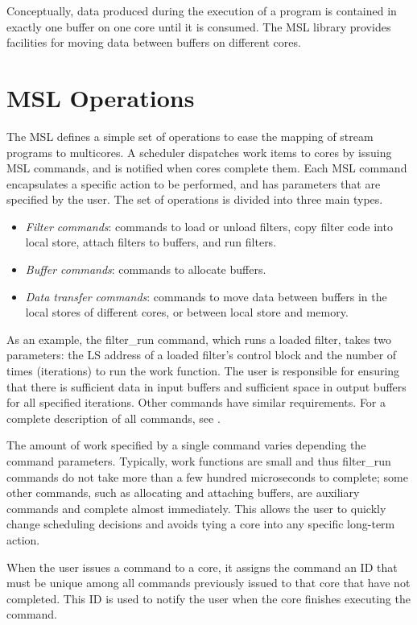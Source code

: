 Conceptually, data produced during the execution of a program is
contained in exactly one buffer on one core until it is consumed. The
MSL library provides facilities for moving data between buffers on
different cores.
 
\section{MSL Operations}

The MSL defines a simple set of operations to ease the mapping of stream
programs to multicores. A scheduler dispatches work items to cores by
issuing MSL commands, and is notified when cores complete
them. Each MSL command encapsulates a specific action to be
performed, and has parameters that are specified by the user. The
set of operations is divided into three main types.
\begin{itemize}
\item {\it Filter commands}: commands to load or unload filters, copy filter code into local store, attach filters to buffers, and run filters.
\item {\it Buffer commands}: commands to allocate buffers.
\item {\it Data transfer commands}: commands to move data between buffers in the local stores of different cores, or between local store and memory.
\end{itemize}

As an example, the \textsf{filter\_run} command, which runs a loaded
filter, takes two parameters: the LS address of a loaded filter's
control block and the number of times (iterations) to run the work function.
The user is responsible for ensuring that there is sufficient
data in input buffers and sufficient space in output buffers for all
specified iterations. Other commands have similar requirements. For a
complete description of all commands, see \cite{dxzhang-meng-07}.

The amount of work specified by a single command varies depending the
command parameters. Typically, work functions are small and thus
\textsf{filter\_run} commands do not take more than a few hundred
microseconds to complete; some other commands, such as allocating and
attaching buffers, are auxiliary commands and complete almost
immediately. This allows the user to quickly change scheduling
decisions and avoids tying a core into any specific long-term action.

When the user issues a command to a core, it assigns the command an ID
that must be unique among all commands previously issued to that core
that have not completed. This ID is used to notify the user when the
core finishes executing the command.

